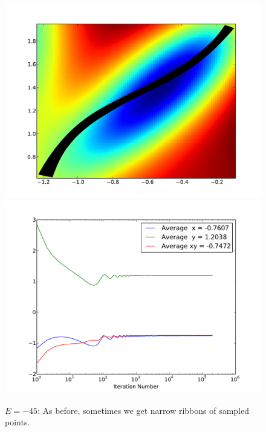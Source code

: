\documentclass[letterpaper]{article}
\begin{document}
\begin{figure}[p]
\begin{center}
\includegraphics[width=5in]{p3.pdf}
\includegraphics[width=5in]{p3a.pdf}
\end{center}
\caption{$E=-45$: As before, sometimes we get narrow ribbons of sampled points.}
\label{fig:p3}
\end{figure}
\end{document}
